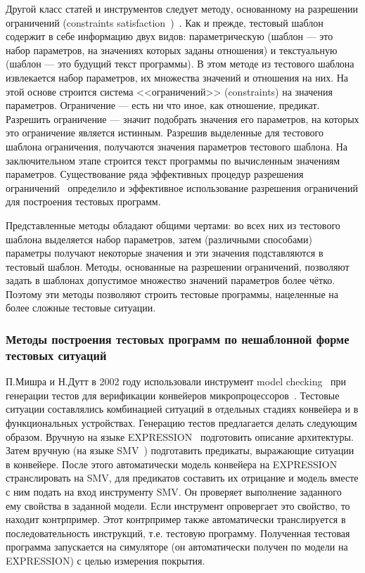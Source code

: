 Другой класс статей и инструментов следует методу, основанному на разрешении ограничений (constraints satisfaction~\cite{CLPusingECLiPSe})~\cite{GenesysPro, GenesysPro2004Innovations, DeepTrans, RAVEN, MAATG}. Как и прежде, тестовый шаблон содержит в себе информацию двух видов: параметрическую (шаблон --- это набор параметров, на значениях которых заданы отношения) и текстуальную (шаблон --- это будущий текст программы). В этом методе из тестового шаблона извлекается набор параметров, их множества значений и отношения на них. На этой основе строится система <<ограничений>> (constraints) на значения параметров. Ограничение --- есть ни что иное, как отношение, предикат. Разрешить ограничение --- значит подобрать значения его параметров, на которых это ограничение является истинным. Разрешив выделенные для тестового шаблона ограничения, получаются значения параметров тестового шаблона. На заключительном этапе строится текст программы по вычисленным значениям параметров. Существование ряда эффективных процедур разрешения ограничений~\cite{CLPusingECLiPSe, SMT} определило и эффективное использование разрешения ограничений для построения тестовых программ.

Представленные методы обладают общими чертами: во всех них из тестового шаблона выделяется набор параметров, затем (различными способами) параметры получают некоторые значения и эти значения подставляются в тестовый шаблон. Методы, основанные на разрешении ограничений, позволяют задать в шаблонах допустимое множество значений параметров более чётко. Поэтому эти методы позволяют строить тестовые программы, нацеленные на более сложные тестовые ситуации.

\subsubsection{Методы построения тестовых программ по нешаблонной форме тестовых ситуаций}%

П.Мишра и Н.Дутт в 2002 году использовали инструмент model checking~\cite{ModelChecking} при генерации тестов для верификации конвейеров микропроцессоров~\cite{MishraDutt02}. Тестовые ситуации составлялись комбинацией ситуаций в отдельных стадиях конвейера и в функциональных устройствах. Генерацию тестов предлагается делать следующим образом. Вручную на языке EXPRESSION~\cite{EXPRESSION} подготовить описание архитектуры. Затем вручную (на языке SMV~\cite{SMV}) подготавить предикаты, выражающие ситуации в конвейере. После этого автоматически модель конвейера на EXPRESSION странслировать на SMV, для предикатов составить их отрицание и модель вместе с ним подать на вход инструменту SMV. Он проверяет выполнение заданного ему свойства в заданной модели. Если инструмент опровергает это свойство, то находит контрпример. Этот контрпример также автоматически транслируется в последовательность инструкций, т.е. тестовую программу. Полученная тестовая программа запускается на симуляторе (он автоматически получен по модели на EXPRESSION) с целью измерения покрытия.

